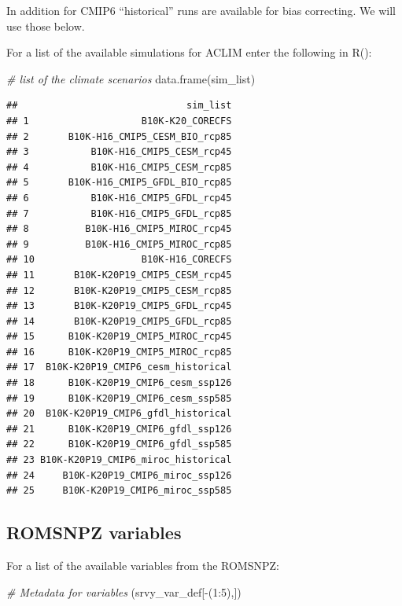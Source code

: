 \documentclass[
]{article}
\newenvironment{Shaded}{\begin{snugshade}}{\end{snugshade}}
\newcommand{\CommentTok}[1]{\textcolor[rgb]{0.56,0.35,0.01}{\textit{#1}}}
\newcommand{\DecValTok}[1]{\textcolor[rgb]{0.00,0.00,0.81}{#1}}
\newcommand{\FunctionTok}[1]{\textcolor[rgb]{0.00,0.00,0.00}{#1}}
\newcommand{\NormalTok}[1]{#1}
\newcommand{\SpecialCharTok}[1]{\textcolor[rgb]{0.00,0.00,0.00}{#1}}
\begin{document}
In addition for CMIP6 ``historical'' runs are available for bias
correcting. We will use those below.

For a list of the available simulations for ACLIM enter the following in
R():

\begin{Shaded}
\begin{Highlighting}[]
    \CommentTok{\# list of the climate scenarios}
    \FunctionTok{data.frame}\NormalTok{(sim\_list)}
\end{Highlighting}
\end{Shaded}

\begin{verbatim}
##                              sim_list
## 1                    B10K-K20_CORECFS
## 2       B10K-H16_CMIP5_CESM_BIO_rcp85
## 3           B10K-H16_CMIP5_CESM_rcp45
## 4           B10K-H16_CMIP5_CESM_rcp85
## 5       B10K-H16_CMIP5_GFDL_BIO_rcp85
## 6           B10K-H16_CMIP5_GFDL_rcp45
## 7           B10K-H16_CMIP5_GFDL_rcp85
## 8          B10K-H16_CMIP5_MIROC_rcp45
## 9          B10K-H16_CMIP5_MIROC_rcp85
## 10                   B10K-H16_CORECFS
## 11       B10K-K20P19_CMIP5_CESM_rcp45
## 12       B10K-K20P19_CMIP5_CESM_rcp85
## 13       B10K-K20P19_CMIP5_GFDL_rcp45
## 14       B10K-K20P19_CMIP5_GFDL_rcp85
## 15      B10K-K20P19_CMIP5_MIROC_rcp45
## 16      B10K-K20P19_CMIP5_MIROC_rcp85
## 17  B10K-K20P19_CMIP6_cesm_historical
## 18      B10K-K20P19_CMIP6_cesm_ssp126
## 19      B10K-K20P19_CMIP6_cesm_ssp585
## 20  B10K-K20P19_CMIP6_gfdl_historical
## 21      B10K-K20P19_CMIP6_gfdl_ssp126
## 22      B10K-K20P19_CMIP6_gfdl_ssp585
## 23 B10K-K20P19_CMIP6_miroc_historical
## 24     B10K-K20P19_CMIP6_miroc_ssp126
## 25     B10K-K20P19_CMIP6_miroc_ssp585
\end{verbatim}

\hypertarget{romsnpz-variables}{%
\subsection{ROMSNPZ variables}\label{romsnpz-variables}}

For a list of the available variables from the ROMSNPZ:

\begin{Shaded}
\begin{Highlighting}[]
    \CommentTok{\# Metadata for variables}
\NormalTok{    (srvy\_var\_def[}\SpecialCharTok{{-}}\NormalTok{(}\DecValTok{1}\SpecialCharTok{:}\DecValTok{5}\NormalTok{),])}
\end{Highlighting}
\end{Shaded}
\end{document}
